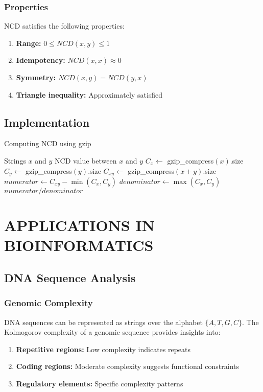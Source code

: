 \documentclass[12pt,a4paper]{report}
\begin{document}
\subsection{Properties}

NCD satisfies the following properties:
\begin{enumerate}
    \item \textbf{Range:} $0 \leq NCD(x, y) \leq 1$
    \item \textbf{Idempotency:} $NCD(x, x) \approx 0$
    \item \textbf{Symmetry:} $NCD(x, y) = NCD(y, x)$
    \item \textbf{Triangle inequality:} Approximately satisfied
\end{enumerate}

\section{Implementation}

\begin{algorithm}
\caption{Computing NCD using gzip}
\begin{algorithmic}[1]
\REQUIRE Strings $x$ and $y$
\ENSURE NCD value between $x$ and $y$
\STATE $C_x \leftarrow$ gzip\_compress$(x)$.size
\STATE $C_y \leftarrow$ gzip\_compress$(y)$.size
\STATE $C_{xy} \leftarrow$ gzip\_compress$(x + y)$.size
\STATE $numerator \leftarrow C_{xy} - \min(C_x, C_y)$
\STATE $denominator \leftarrow \max(C_x, C_y)$
\RETURN $numerator / denominator$
\end{algorithmic}
\end{algorithm}

\chapter{APPLICATIONS IN BIOINFORMATICS}

\section{DNA Sequence Analysis}

\subsection{Genomic Complexity}

DNA sequences can be represented as strings over the alphabet $\{A, T, G, C\}$. The Kolmogorov complexity of a genomic sequence provides insights into:

\begin{enumerate}
    \item \textbf{Repetitive regions:} Low complexity indicates repeats
    \item \textbf{Coding regions:} Moderate complexity suggests functional constraints
    \item \textbf{Regulatory elements:} Specific complexity patterns
\end{enumerate}
\end{document}
